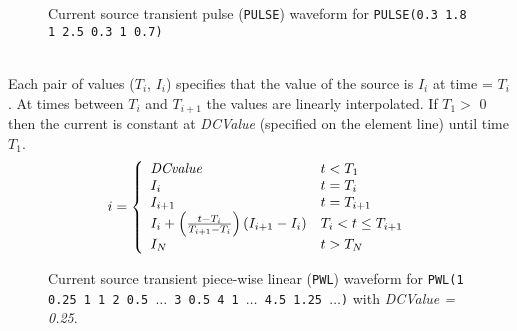 \begin{figure}[hbp]
\centering

\caption[Current source transient pulse ({\tt PULSE}) waveform]{Current source
transient pulse ({\tt PULSE}) waveform for\newline \hspace*{\fill}
{\tt PULSE(0.3 1.8 1 2.5 0.3 1 0.7)} \hspace*{\fill} \label{fig:ipulse}}
\end{figure}

\\[0.2in]
Each pair of values ($T_i$, $I_i$) specifies that  the  value
of  the  source  is $I_i$ at time = $T_i$. At times between $T_i$ and
$T_{i+1}$ the values are linearly interpolated.
If $T_1 >$ 0 then the current is constant at {\it DCValue}
(specified on the element line) until time $T_1$.
\begin{equation}
i = \left\{ \begin{array}{ll}
    {\it DCvalue}& t < T_1\\
    I_i         & t = T_i\\
    I_{i+1}     & t = T_{i+1}\\
    I_i + \left({{t-T_i} \over {T_{i+1} - T_i}}\right)(I_{i+1}-I_i)
                & T_i < t \le T_{i+1}\\
    I_N         & t > T_N\\
     \end{array} \right. %
\end{equation}
\begin{figure}[hbp]
\centering

\caption[Current source transient piece-wise linear ({\tt PWL}) waveform]{Current
source transient piece-wise linear ({\tt PWL}) waveform for\newline\hspace*{\fill}
{\tt PWL(1 0.25  1 1 2 0.5 $\ldots$ 3 0.5 4 1 $\ldots$ 4.5 1.25 $\ldots$)} with
{\it DCValue = 0.25}.  \hspace*{\fill} }
\end{figure}


\\[0.2in]



